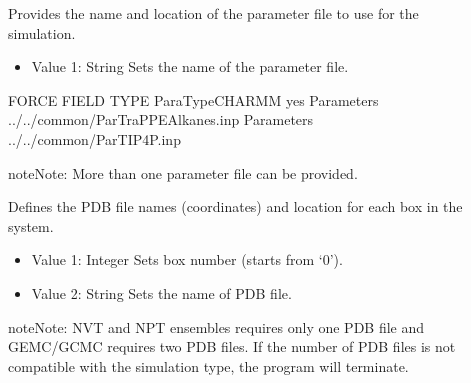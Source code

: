 \documentclass[letterpaper,10pt,english]{sphinxmanual}
\begin{document}
\begin{description}
\item[{}] \leavevmode
\sphinxAtStartPar
Provides the name and location of the parameter file to use for the simulation.
\begin{itemize}
\item {} 
\sphinxAtStartPar
Value 1: String \sphinxhyphen{} Sets the name of the parameter file.

\end{itemize}

\begin{sphinxVerbatim}[commandchars=\\\{\}]
\PYGZsh{}\PYGZsh{}\PYGZsh{}\PYGZsh{}\PYGZsh{}\PYGZsh{}\PYGZsh{}\PYGZsh{}\PYGZsh{}\PYGZsh{}\PYGZsh{}\PYGZsh{}\PYGZsh{}\PYGZsh{}\PYGZsh{}\PYGZsh{}\PYGZsh{}\PYGZsh{}\PYGZsh{}\PYGZsh{}\PYGZsh{}\PYGZsh{}\PYGZsh{}\PYGZsh{}\PYGZsh{}\PYGZsh{}\PYGZsh{}\PYGZsh{}\PYGZsh{}\PYGZsh{}\PYGZsh{}\PYGZsh{}\PYGZsh{}
\PYGZsh{} FORCE FIELD TYPE
\PYGZsh{}\PYGZsh{}\PYGZsh{}\PYGZsh{}\PYGZsh{}\PYGZsh{}\PYGZsh{}\PYGZsh{}\PYGZsh{}\PYGZsh{}\PYGZsh{}\PYGZsh{}\PYGZsh{}\PYGZsh{}\PYGZsh{}\PYGZsh{}\PYGZsh{}\PYGZsh{}\PYGZsh{}\PYGZsh{}\PYGZsh{}\PYGZsh{}\PYGZsh{}\PYGZsh{}\PYGZsh{}\PYGZsh{}\PYGZsh{}\PYGZsh{}\PYGZsh{}\PYGZsh{}\PYGZsh{}\PYGZsh{}\PYGZsh{}
ParaTypeCHARMM    yes
Parameters        ../../common/Par\PYGZus{}TraPPE\PYGZus{}Alkanes.inp
Parameters        ../../common/Par\PYGZus{}TIP4P.inp
\end{sphinxVerbatim}

\begin{sphinxadmonition}{note}{Note:}
\sphinxAtStartPar
More than one parameter file can be provided.
\end{sphinxadmonition}

\item[{}] \leavevmode
\sphinxAtStartPar
Defines the PDB file names (coordinates) and location for each box in the system.
\begin{itemize}
\item {} 
\sphinxAtStartPar
Value 1: Integer \sphinxhyphen{} Sets box number (starts from ‘0’).

\item {} 
\sphinxAtStartPar
Value 2: String \sphinxhyphen{} Sets the name of PDB file.

\end{itemize}

\begin{sphinxadmonition}{note}{Note:}
\sphinxAtStartPar
NVT and NPT ensembles requires only one PDB file and GEMC/GCMC requires two PDB files. If the number of PDB files is not compatible with the simulation type, the program will terminate.
\end{sphinxadmonition}


\end{description}
\end{document}
